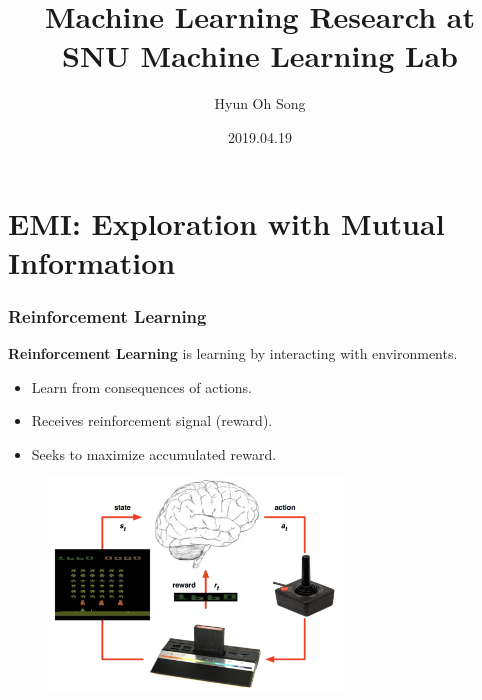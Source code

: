 \documentclass[10pt,mathserif]{beamer}
\title{Machine Learning Research at SNU Machine Learning Lab}
\author{Hyun Oh Song}
\institute
    {Seoul National University}
\date{2019.04.19}
\begin{document}
\begin{frame}
  \titlepage
\end{frame}

\section{EMI: Exploration with Mutual Information}


\begin{frame}
\frametitle{Reinforcement Learning}
  \textbf{Reinforcement Learning} is learning by interacting with environments.

  \begin{itemize} \itemsep=6pt
      \item Learn from consequences of actions.
      \item Receives reinforcement signal (reward).
      \item Seeks to maximize accumulated reward.
  \end{itemize}
  \begin{figure}[h]
        \centering
          \includegraphics[width=0.7\textwidth]{emi_figures/mk_intro}
  \end{figure}
\end{frame}
\end{document}
